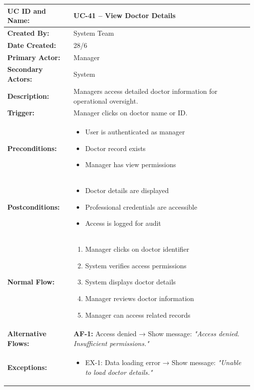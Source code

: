 \documentclass[12pt,a4paper]{article}
\begin{document}
\renewcommand{\arraystretch}{1.5}
\begin{longtable}{|p{4.5cm}|p{10.5cm}|}
\hline
\textbf{UC ID and Name:} & UC-41 – View Doctor Details \\
\hline
\textbf{Created By:} & System Team \\
\hline
\textbf{Date Created:} & 28/6 \\
\hline
\textbf{Primary Actor:} & Manager \\
\hline
\textbf{Secondary Actors:} & System \\
\hline
\textbf{Description:} & Managers access detailed doctor information for operational oversight. \\
\hline
\textbf{Trigger:} & Manager clicks on doctor name or ID. \\
\hline
\textbf{Preconditions:} &
\begin{itemize}
  \item User is authenticated as manager
  \item Doctor record exists
  \item Manager has view permissions
\end{itemize} \\
\hline
\textbf{Postconditions:} &
\begin{itemize}
  \item Doctor details are displayed
  \item Professional credentials are accessible
  \item Access is logged for audit
\end{itemize} \\
\hline
\textbf{Normal Flow:} &
\begin{enumerate}
  \item Manager clicks on doctor identifier
  \item System verifies access permissions
  \item System displays doctor details
  \item Manager reviews doctor information
  \item Manager can access related records
\end{enumerate} \\
\hline
\textbf{Alternative Flows:} &
\textbf{AF-1:} Access denied → Show message: \textit{"Access denied. Insufficient permissions."} \\
\hline
\textbf{Exceptions:} &
\begin{itemize}
  \item EX-1: Data loading error → Show message: \textit{"Unable to load doctor details."}

\end{itemize}
\end{longtable}
\end{document}
